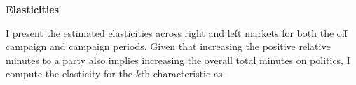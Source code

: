 \documentclass[12pt]{article}
\begin{document}

	
	
	\textbf{Elasticities}
	
	I present the estimated elasticities across right and left markets for both the off campaign and campaign periods.  Given that increasing the positive relative minutes to a party also implies increasing the overall total minutes on politics, I compute the elasticity for the $k$th characteristic as: 
	
\end{document}
